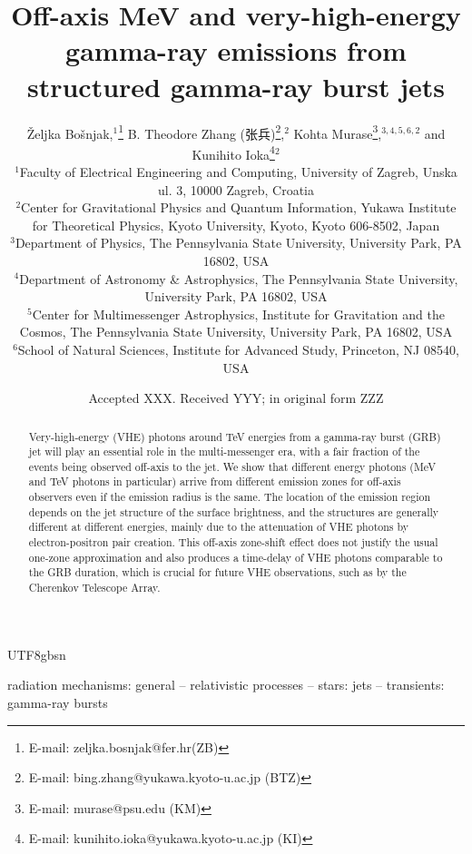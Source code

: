 \documentclass[fleqn,usenatbib]{mnras}
\title[Off-axis MeV/TeV photons from structured GRB jets]{Off-axis MeV and very-high-energy gamma-ray emissions from structured gamma-ray burst jets}
\author[\v Z. Bo\v snjak et al.]{
\v Zeljka Bo\v snjak,$^{1}$\thanks{E-mail: zeljka.bosnjak@fer.hr(ZB)}
B. Theodore Zhang (张兵)\thanks{E-mail: bing.zhang@yukawa.kyoto-u.ac.jp (BTZ)},$^{2}$
Kohta Murase\thanks{E-mail: murase@psu.edu (KM)},$^{3,4,5,6,2}$
and Kunihito Ioka\thanks{E-mail: kunihito.ioka@yukawa.kyoto-u.ac.jp (KI)}$^{2}$
\\
$^{1}$Faculty of Electrical Engineering and Computing, University of Zagreb, Unska ul. 3, 10000 Zagreb, Croatia\\
$^{2}${Center for Gravitational Physics and Quantum Information, Yukawa Institute for Theoretical Physics, Kyoto University, Kyoto, Kyoto 606-8502, Japan}\\
$^{3}${Department of Physics, The Pennsylvania State University, University Park, PA 16802, USA}\\
$^{4}${Department of Astronomy \& Astrophysics, The Pennsylvania State University, University Park, PA 16802, USA}\\
$^{5}${Center for Multimessenger Astrophysics, Institute for Gravitation and the Cosmos, The Pennsylvania State University, University Park, PA 16802, USA}\\
$^{6}${School of Natural Sciences, Institute for Advanced Study, Princeton, NJ 08540, USA}
}
\date{Accepted XXX. Received YYY; in original form ZZZ}
\begin{document}
\begin{CJK*}{UTF8}{gbsn}
\label{firstpage}
\pagerange{\pageref{firstpage}--\pageref{lastpage}}
\maketitle

\begin{abstract}
Very-high-energy (VHE) photons around TeV energies from a gamma-ray burst (GRB) jet will play an essential role in the multi-messenger era, with a fair fraction of the events being observed off-axis to the jet. We show that different energy photons (MeV and TeV photons in particular) arrive from different emission zones for off-axis observers even if the emission radius is the same. The location of the emission region depends on the jet structure of the surface brightness, and the structures are generally different at different energies, mainly due to the attenuation of VHE photons by electron-positron pair creation. This off-axis zone-shift effect does not justify the usual one-zone approximation and also produces a time-delay of VHE photons comparable to the GRB duration, which is crucial for future VHE observations, such as by the Cherenkov Telescope Array. 

\end{abstract}

\begin{keywords}
radiation mechanisms: general -- relativistic processes -- stars: jets -- transients: gamma-ray bursts
\end{keywords}




\end{CJK*}
\end{document}
